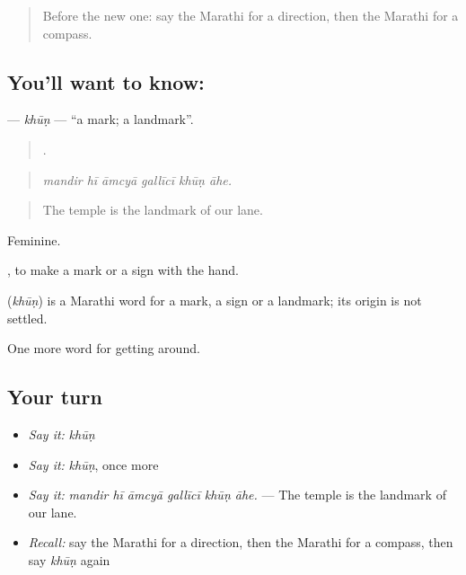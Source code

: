 \label{lesson:MR-C412-khun}



\begin{quote}
Before the new one: say the Marathi for a direction, then the Marathi for a compass.
\end{quote}

\subsection*{You'll want to know: }
\textbf{} — \emph{khūṇ} — \textquotedblleft{}a mark; a landmark\textquotedblright{}.

\begin{quote}
     .
\end{quote}

\begin{quote}
\emph{mandir hī āmcyā gallīcī khūṇ āhe.}
\end{quote}

\begin{quote}
The temple is the landmark of our lane.
\end{quote}

Feminine.

 , to make a mark or a sign with the hand.

\begin{cousinweb}
\textbf{} (\emph{khūṇ}) is a Marathi word for a mark, a sign or a landmark; its origin is not settled.
\end{cousinweb}

\begin{grammarlens}[title={What you've built}]
One more word for getting around.
\end{grammarlens}

\subsection*{Your turn}
\begin{itemize}
\raggedright
  \item \emph{Say it:} \emph{khūṇ}
  \item \emph{Say it:} \emph{khūṇ}, once more
  \item \emph{Say it:} \emph{mandir hī āmcyā gallīcī khūṇ āhe.} — The temple is the landmark of our lane.
  \item \emph{Recall:} say the Marathi for a direction, then the Marathi for a compass, then say \emph{khūṇ} again
\end{itemize}

